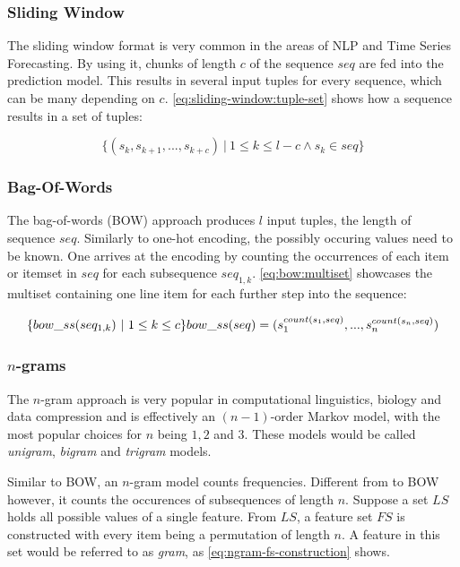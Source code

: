 \subsubsection*{Sliding Window}
The sliding window format is very common in the areas of NLP and Time Series Forecasting. By using it, chunks of length $c$ of the sequence $seq$ are fed into the prediction model. This results in several input tuples for every sequence, which can be many depending on $c$. \autoref{eq:sliding-window:tuple-set} shows how a sequence results in a set of tuples:

\begin{equation}
    \label{eq:sliding-window:tuple-set}
    \{ (s_k, s_{k+1}, ..., s_{k+c})\ |\ 1 \leq k \leq l-c \wedge s_k \in seq \}
\end{equation}

\subsubsection*{Bag-Of-Words}
The bag-of-words (BOW) approach produces $l$ input tuples, the length of sequence $seq$. Similarly to one-hot encoding, the possibly occuring values need to be known. One arrives at the encoding by counting the occurrences of each item or itemset in $seq$ for each subsequence $seq_{1,k}$. \autoref{eq:bow:multiset} showcases the multiset containing one line item for each further step into the sequence:

\begin{equation}
    \label{eq:bow:multiset}
    \{ bow\_ss(seq_{1,k})\ |\ 1 \leq k \leq c \} \\
    bow\_ss(seq) = ( s_1^{count(s_1,seq)}, ..., s_n^{count(s_n,seq)} )
\end{equation}

\subsubsection*{$n$-grams}
The $n$-gram approach is very popular in computational linguistics, biology and data compression and is effectively an $(n-1)$-order Markov model, with the most popular choices for $n$ being $1,2$ and $3$. These models would be called \textit{unigram}, \textit{bigram} and \textit{trigram} models.

Similar to BOW, an $n$-gram model counts frequencies. Different from to BOW however, it counts the occurences of subsequences of length $n$. Suppose a set $LS$ holds all possible values of a single feature. From $LS$, a feature set $FS$ is constructed with every item being a permutation of length $n$. A feature in this set would be referred to as \textit{gram}, as \autoref{eq:ngram-fs-construction} shows.

